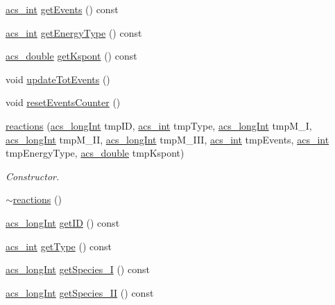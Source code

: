 \begin{DoxyCompactItemize}
\hyperlink{a00050_a8d277355641a098190360234e2ebde35}{acs\-\_\-int} \hyperlink{a00021_a4fd82a3f1a6474e53709c2a8c04b793c}{get\-Events} () const 
\item 
\hyperlink{a00050_a8d277355641a098190360234e2ebde35}{acs\-\_\-int} \hyperlink{a00021_ae6fce196577644283fdab4a78909d891}{get\-Energy\-Type} () const 
\item 
\hyperlink{a00050_ab776853a005fcbf56af0424a2a4dd607}{acs\-\_\-double} \hyperlink{a00021_a3cac13cba00c709df26485bbeffda4f0}{get\-Kspont} () const 
\item 
void \hyperlink{a00021_ae7a0bcb1c921c25ad5dc637d664f2c94}{update\-Tot\-Events} ()
\item 
void \hyperlink{a00021_a614a367a15dda1df4160bcdc170a9b32}{reset\-Events\-Counter} ()
\item 
\hyperlink{a00021_a0b6ca1c86d79bb511f116d86714f74a6}{reactions} (\hyperlink{a00050_a19319d75f02db4308bc5c0026d98cd85}{acs\-\_\-long\-Int} tmp\-I\-D, \hyperlink{a00050_a8d277355641a098190360234e2ebde35}{acs\-\_\-int} tmp\-Type, \hyperlink{a00050_a19319d75f02db4308bc5c0026d98cd85}{acs\-\_\-long\-Int} tmp\-M\-\_\-\-I, \hyperlink{a00050_a19319d75f02db4308bc5c0026d98cd85}{acs\-\_\-long\-Int} tmp\-M\-\_\-\-I\-I, \hyperlink{a00050_a19319d75f02db4308bc5c0026d98cd85}{acs\-\_\-long\-Int} tmp\-M\-\_\-\-I\-I\-I, \hyperlink{a00050_a8d277355641a098190360234e2ebde35}{acs\-\_\-int} tmp\-Events, \hyperlink{a00050_a8d277355641a098190360234e2ebde35}{acs\-\_\-int} tmp\-Energy\-Type, \hyperlink{a00050_ab776853a005fcbf56af0424a2a4dd607}{acs\-\_\-double} tmp\-Kspont)
\begin{DoxyCompactList}\small\item\em Constructor. \end{DoxyCompactList}\item 
\hyperlink{a00021_ad0c79e56e87891c502d8fcd6c4005987}{$\sim$reactions} ()
\item 
\hyperlink{a00050_a19319d75f02db4308bc5c0026d98cd85}{acs\-\_\-long\-Int} \hyperlink{a00021_a5c30ce559254e67f7d4e219a8fe26fcc}{get\-I\-D} () const 
\item 
\hyperlink{a00050_a8d277355641a098190360234e2ebde35}{acs\-\_\-int} \hyperlink{a00021_ad928f8c901ad8e318e201cedcf1209ba}{get\-Type} () const 
\item 
\hyperlink{a00050_a19319d75f02db4308bc5c0026d98cd85}{acs\-\_\-long\-Int} \hyperlink{a00021_a90adbdb8288b8c67c7715949848583ab}{get\-Species\-\_\-\-I} () const 
\item 
\hyperlink{a00050_a19319d75f02db4308bc5c0026d98cd85}{acs\-\_\-long\-Int} \hyperlink{a00021_ac0bdd6d9081645bf3a2c5531a71cbe40}{get\-Species\-\_\-\-I\-I} () const 

\end{DoxyCompactItemize}
